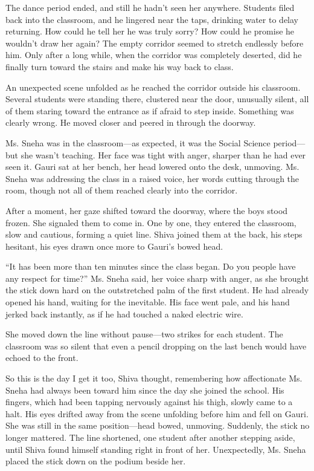 The dance period ended, and still he hadn't seen her anywhere. Students filed back into the classroom, and he lingered near the taps, drinking water to delay returning. How could he tell her he was truly sorry? How could he promise he wouldn't draw her again? The empty corridor seemed to stretch endlessly before him. Only after a long while, when the corridor was completely deserted, did he finally turn toward the stairs and make his way back to class.

An unexpected scene unfolded as he reached the corridor outside his classroom. Several students were standing there, clustered near the door, unusually silent, all of them staring toward the entrance as if afraid to step inside. Something was clearly wrong. He moved closer and peered in through the doorway.

Ms. Sneha was in the classroom—as expected, it was the Social Science period—but she wasn't teaching. Her face was tight with anger, sharper than he had ever seen it. Gauri sat at her bench, her head lowered onto the desk, unmoving. Ms. Sneha was addressing the class in a raised voice, her words cutting through the room, though not all of them reached clearly into the corridor.

After a moment, her gaze shifted toward the doorway, where the boys stood frozen. She signaled them to come in. One by one, they entered the classroom, slow and cautious, forming a quiet line. Shiva joined them at the back, his steps hesitant, his eyes drawn once more to Gauri's bowed head.

``It has been more than ten minutes since the class began. Do you people have any respect for time?'' Ms. Sneha said, her voice sharp with anger, as she brought the stick down hard on the outstretched palm of the first student. He had already opened his hand, waiting for the inevitable. His face went pale, and his hand jerked back instantly, as if he had touched a naked electric wire.

She moved down the line without pause—two strikes for each student. The classroom was so silent that even a pencil dropping on the last bench would have echoed to the front.

So this is the day I get it too, Shiva thought, remembering how affectionate Ms. Sneha had always been toward him since the day she joined the school. His fingers, which had been tapping nervously against his thigh, slowly came to a halt. His eyes drifted away from the scene unfolding before him and fell on Gauri. She was still in the same position—head bowed, unmoving. Suddenly, the stick no longer mattered. The line shortened, one student after another stepping aside, until Shiva found himself standing right in front of her. Unexpectedly, Ms. Sneha placed the stick down on the podium beside her.

